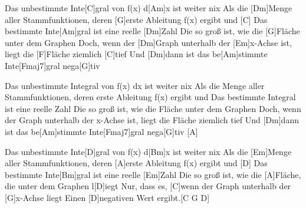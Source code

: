 

\begin{guitar}
	Das unbestimmte Inte[C]gral von f(x) d[Am]x ist weiter nix
	Als die [Dm]Menge aller Stammfunktionen, deren [G]erste Ableitung f(x) ergibt und
	[C] Das bestimmte Inte[Am]gral ist eine reelle [Dm]Zahl
	Die so groß ist, wie die [G]Fläche unter dem Graphen
	Doch, wenn der [Dm]Graph unterhalb der [Em]x-Achse ist, liegt die [F]Fläche ziemlich [C]tief
	Und [Dm]dann ist das be[Am]stimmte Inte[Fmaj7]gral nega[G]tiv
	
	Das unbestimmte Integral von f(x) dx ist weiter nix
	Als die Menge aller Stammfunktionen, deren erste Ableitung f(x) ergibt und
	Das bestimmte Integral ist eine reelle Zahl
	Die so groß ist, wie die Fläche unter dem Graphen
	Doch, wenn der Graph unterhalb der x-Achse ist, liegt die Fläche ziemlich tief
	Und [Dm]dann ist das be[Am]stimmte Inte[Fmaj7]gral nega[G]tiv [A]{}
	
	Das unbestimmte Inte[D]gral von f(x) d[Bm]x ist weiter nix
	Als die [Em]Menge aller Stammfunktionen, deren [A]erste Ableitung f(x) ergibt und
	[D] Das bestimmte Inte[Bm]gral ist eine reelle [Em]Zahl
	Die so groß ist, wie die [A]Fläche, die unter dem Graphen l[D]iegt
	Nur, dass es, [C]wenn der Graph unterhalb der [G]x-Achse liegt
	Einen [D]negativen Wert ergibt.[C G D]{}
\end{guitar}